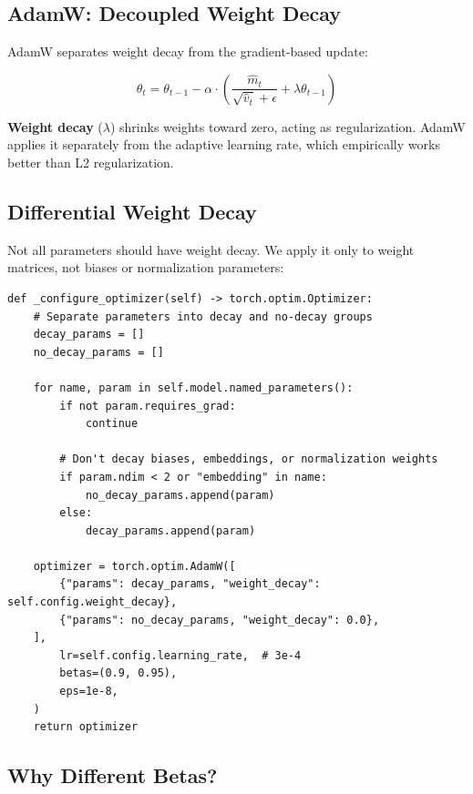 \subsection{AdamW: Decoupled Weight Decay}

AdamW separates weight decay from the gradient-based update:

\begin{equation}
\theta_t = \theta_{t-1} - \alpha \cdot \left( \frac{\hat{m}_t}{\sqrt{\hat{v}_t} + \epsilon} + \lambda \theta_{t-1} \right)
\end{equation}

\begin{keypoint}
\textbf{Weight decay} ($\lambda$) shrinks weights toward zero, acting as regularization. AdamW applies it separately from the adaptive learning rate, which empirically works better than L2 regularization.
\end{keypoint}

\subsection{Differential Weight Decay}

Not all parameters should have weight decay. We apply it only to weight matrices, not biases or normalization parameters:

\begin{lstlisting}[style=python, caption={Optimizer configuration from trainer.py}]
def _configure_optimizer(self) -> torch.optim.Optimizer:
    # Separate parameters into decay and no-decay groups
    decay_params = []
    no_decay_params = []

    for name, param in self.model.named_parameters():
        if not param.requires_grad:
            continue

        # Don't decay biases, embeddings, or normalization weights
        if param.ndim < 2 or "embedding" in name:
            no_decay_params.append(param)
        else:
            decay_params.append(param)

    optimizer = torch.optim.AdamW([
        {"params": decay_params, "weight_decay": self.config.weight_decay},
        {"params": no_decay_params, "weight_decay": 0.0},
    ],
        lr=self.config.learning_rate,  # 3e-4
        betas=(0.9, 0.95),
        eps=1e-8,
    )
    return optimizer
\end{lstlisting}

\subsection{Why Different Betas?}

